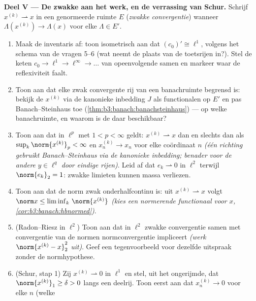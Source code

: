 \begin{problem}[{Weekendopgave --- $(\ell^p)' = \ell^q$,
reflexiviteit, en het vreemde van $\ell^\infty$}]
\medskip
\noindent\textbf{Deel V --- De zwakke  aan het werk, en
de verrassing van Schur.} Schrijf $x^{(k)} \rightharpoonup x$ in
een genormeerde ruimte $E$ (\emph{zwakke convergentie}) wanneer
$\Lambda(x^{(k)}) \to \Lambda(x)$ voor elke $\Lambda \in E'$.
\begin{enumerate}[resume]
  \item Maak de inventaris af: toon isometrisch aan dat $(c_0)'
        \cong \ell^1$, volgens het schema van de vragen 5--6 (wat
        neemt de plaats van de toetsrijen in?). Stel de keten $c_0
        \to \ell^1 \to \ell^\infty \to \dots$ van opeenvolgende
         samen en markeer waar de reflexiviteit
        faalt.
  \item Toon aan dat elke zwak convergente rij van een
        banachruimte begrensd is: bekijk de $x^{(k)}$ via de
        kanonieke inbedding $J$ als functionalen op $E'$ en pas
        Banach--Steinhaus toe
        (\cref{thm:b3:banach:banachsteinhaus}) --- op welke
        banachruimte, en waarom is de  daar
        beschikbaar?
  \item Toon aan dat in $\ell^p$ met $1 < p < \infty$ geldt:
        $x^{(k)} \rightharpoonup x$ dan en slechts dan als
        $\sup_k\norm{x^{(k)}}_p < \infty$ en $x^{(k)}_n \to x_n$
        voor elke coördinaat $n$ \emph{(één richting gebruikt
        Banach--Steinhaus via de kanonieke inbedding; benader voor
        de andere $y \in \ell^q$ door eindige rijen)}. Leid af dat
        $e_k \rightharpoonup 0$ in $\ell^2$ terwijl
        $\norm{e_k}_2 = 1$: zwakke limieten kunnen massa
        verliezen.
  \item Toon aan dat de norm zwak onderhalfcontinu is: uit
        $x^{(k)} \rightharpoonup x$ volgt $\norm x \leq
        \liminf_k\,\norm{x^{(k)}}$ \emph{(kies een normerende
        functionaal voor $x$, \cref{cor:b3:banach:hbnormed})}.
  \item (Radon--Riesz in $\ell^2$) Toon aan dat in $\ell^2$ zwakke
        convergentie samen met convergentie van de normen
        normconvergentie impliceert \emph{(werk $\norm{x^{(k)} -
        x}_2^2$ uit)}. Geef een tegenvoorbeeld voor dezelfde
        uitspraak zonder de normhypothese.
  \item (Schur, stap 1) Zij $x^{(k)} \rightharpoonup 0$ in
        $\ell^1$ en stel, uit het ongerijmde, dat
        $\norm{x^{(k)}}_1 \geq \delta > 0$ langs een deelrij. Toon
        eerst aan dat $x^{(k)}_n \to 0$ voor elke $n$ (welke

\end{enumerate}
\end{problem}
